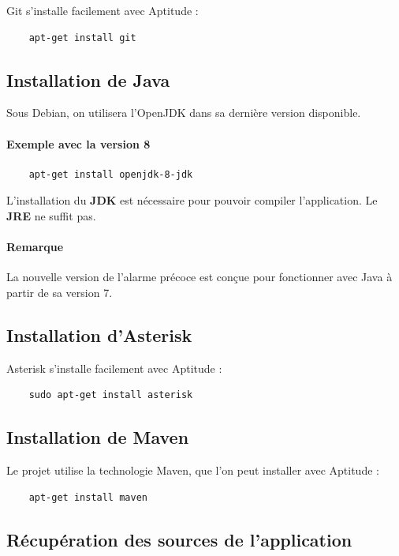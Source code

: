 \documentclass{article}
\begin{document}
Git s'installe facilement avec Aptitude :

\begin{verbatim}
    apt-get install git
\end{verbatim}

\subsection{Installation de Java}

Sous Debian, on utilisera l'OpenJDK dans sa dernière version disponible.

\paragraph{Exemple avec la version 8}

\begin{verbatim}
    apt-get install openjdk-8-jdk
\end{verbatim}

L'installation du \textbf{JDK} est nécessaire pour pouvoir compiler l'application. Le \textbf{JRE} ne suffit pas.

\paragraph{Remarque} La nouvelle version de l'alarme précoce est conçue pour fonctionner avec Java à partir de sa version 7.

\subsection{Installation d'Asterisk}

Asterisk s'installe facilement avec Aptitude :

\begin{verbatim}
    sudo apt-get install asterisk
\end{verbatim}

\subsection{Installation de Maven}

Le projet utilise la technologie Maven, que l'on peut installer avec Aptitude :

\begin{verbatim}
    apt-get install maven
\end{verbatim}

\subsection{Récupération des sources de l'application}
\end{document}
